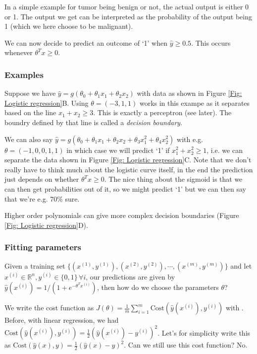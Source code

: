 \documentclass[a4paper, 10pt,hidelinks]{article}
\newcommand{\R}{\mathbb{R}}
\newcommand{\ind}[1]{^{(#1)}}
\begin{document}
In a simple example for tumor being benign or not, the actual output is either 0 or 1. The output we get can be interpreted as the probability of the output being 1 (which we here choose to be malignant). %

We can now decide to predict an outcome of `1' when $\hat{y} \geq 0.5$. This occurs whenever $\theta^T x \geq 0$.


\subsubsection{Examples}
Suppose we have $\hat{y} = g(\theta_0 + \theta_1 x_1 + \theta_2 x_2)$ with data as shown in Figure \ref{Fig: Logistic regression}B. Using $\theta = (-3, 1, 1)$ works in this exampe as it separates based on the line $x_1 + x_2 \geq 3$. This is exactly a perceptron (see later). The boundry defined by that line is called a \emph{decision boundary}.

We can also say $\hat{y} = g(\theta_0 + \theta_1 x_1 + \theta_2 x_2 + \theta_3 x_1^2 + \theta_4 x^2_2)$ with e.g. $\theta = (-1, 0, 0, 1, 1)$ in which case we will predict `1' if $x_1^2 + x_2^2 \geq 1$, i.e. we can separate the data shown in Figure \ref{Fig: Logistic regression}C. Note that we don't really have to think much about the logistic curve itself, in the end the prediction just depends on whether $\theta^T x \geq 0$. The nice thing about the sigmoid is that we can then get probabilities out of it, so we might predict `1' but we can then say that we're e.g. 70\% sure. 

Higher order polynomials can give more complex decision boundaries (Figure \ref{Fig: Logistic regression}D).

\subsubsection{Fitting parameters}
Given a training set $\{ (x^{(1)}, y^{(1)}), (x\ind{2}, y\ind{2}), \cdots, (x\ind{m}, y\ind{m})\}$ and let $x\ind{i} \in \R^n, y\ind{i} \in \{0, 1\} \, \forall i$, our predictions are given by $\hat{y}(x\ind{i}) = 1/(1 + e^{-\theta^T x\ind{i}})$, then how do we choose the parameters $\theta$?

We write the cost function as $J(\theta) = \frac{1}{m} \sum_{i = 1}^m \text{Cost}(\hat{y}(x\ind{i}), y\ind{i})$ with . Before, with linear regression, we had  $\text{Cost}(\hat{y}(x\ind{i}), y\ind{i}) = \frac{1}{2} (\hat{y}(x\ind{i}) - y\ind{i})^2$. Let's for simplicity write this as $\text{Cost}(\hat{y}(x), y) = \frac{1}{2} (\hat{y}(x) - y)^2$. Can we still use this cost function? No.
\end{document}
